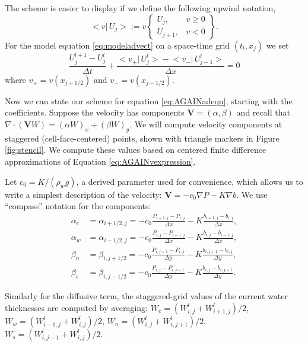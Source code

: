 \documentclass[12pt,final]{amsart}%
\newcommand\bV{\mathbf{V}}
\newcommand{\Div}{\nabla\cdot}
\newcommand{\grad}{\nabla}
\begin{document}
The scheme is easier to display if we define the following upwind notation,
\newcommand{\up}[2]{\big<#1\big|\,#2\big>}
	$$\up{v}{U_j} := v \begin{Bmatrix} U_j, & v \ge 0 \\ U_{j+1}, & v < 0 \end{Bmatrix}.$$
For the model equation \eqref{eq:modeladvect} on a space-time grid $(t_l,x_j)$ we set
\begin{equation}\label{eq:modelfdadvect}
\frac{U_j^{l+1} - U_j^l}{\Delta t} + \frac{\up{v_+}{U_j^l} - \up{v_-}{U_{j-1}^l}}{\Delta x} = 0
\end{equation}
where $v_+ = v(x_{j+1/2})$ and $v_-=v(x_{j-1/2})$.

Now we can state our scheme for equation \eqref{eq:AGAINadeqn}, starting with the coefficients.  Suppose the velocity has components $\bV = (\alpha,\beta)$ and recall that $\Div \left(\bV W\right) = (\alpha W)_x + (\beta W)_y$.  We will compute velocity components at staggered (cell-face-centered) points, shown with triangle markers in Figure \ref{fig:stencil}.  We compute these values based on centered finite difference approximations of Equation \eqref{eq:AGAINvexpression}.

Let $c_0=K/(\rho_w g)$, a derived parameter used for convenience, which allows us to write a simplest description of the velocity:  $\bV = - c_0 \grad P - K \grad b$.  We use ``compass'' notation for the components:
\begin{align*}
\alpha_e &= \alpha_{i+1/2,j} = - c_0 \frac{P_{i+1,j}-P_{i,j}}{\Delta x} - K \frac{b_{i+1,j}-b_{i,j}}{\Delta x}, \\
\alpha_w &= \alpha_{i-1/2,j} = - c_0 \frac{P_{i,j}-P_{i-1,j}}{\Delta x} - K \frac{b_{i,j}-b_{i-1,j}}{\Delta x}, \\
\beta_n  &= \beta_{i,j+1/2} = - c_0 \frac{P_{i,j+1}-P_{i,j}}{\Delta y} - K \frac{b_{i,j+1}-b_{i,j}}{\Delta y}, \\
\beta_s  &= \beta_{i,j-1/2} = - c_0 \frac{P_{i,j}-P_{i,j-1}}{\Delta y} - K \frac{b_{i,j}-b_{i,j-1}}{\Delta y}.
\end{align*}

Similarly for the diffusive term, the staggered-grid values of the current water thicknesses are computed by averaging: $W_e = (W_{i,j}^l + W_{i+1,j}^l)/2$, $W_w = (W_{i-1,j}^l + W_{i,j}^l)/2$, $W_n = (W_{i,j}^l + W_{i,j+1}^l)/2$, $W_s = (W_{i,j-1}^l + W_{i,j}^l)/2$.
\end{document}
